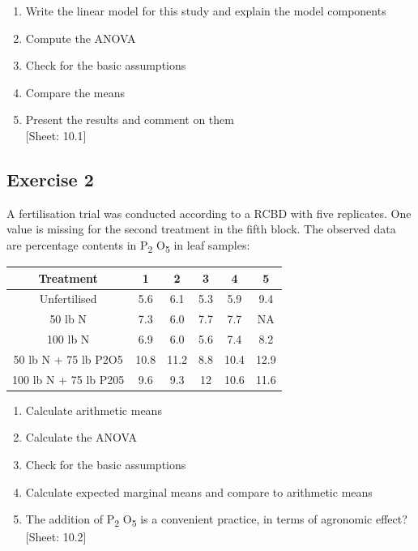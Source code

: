 \documentclass[a4paper,12pt,oneside]{book}
\providecommand{\tightlist}{%
  \setlength{\itemsep}{0pt}\setlength{\parskip}{0pt}}
\begin{document}
\begin{enumerate}
\def\labelenumi{\arabic{enumi}.}
\tightlist
\item
  Write the linear model for this study and explain the model components
\item
  Compute the ANOVA
\item
  Check for the basic assumptions
\item
  Compare the means
\item
  Present the results and comment on them\\
  {[}Sheet: 10.1{]}
\end{enumerate}

\hypertarget{exercise-2-6}{%
\subsection{Exercise 2}\label{exercise-2-6}}

A fertilisation trial was conducted according to a RCBD with five replicates. One value is missing for the second treatment in the fifth block. The observed data are percentage contents in P\textsubscript{2} O\textsubscript{5} in leaf samples:

\begin{longtable}[]{@{}cccccc@{}}
\toprule
Treatment & 1 & 2 & 3 & 4 & 5 \\
\midrule
\endhead
Unfertilised & 5.6 & 6.1 & 5.3 & 5.9 & 9.4 \\
50 lb N & 7.3 & 6.0 & 7.7 & 7.7 & NA \\
100 lb N & 6.9 & 6.0 & 5.6 & 7.4 & 8.2 \\
50 lb N + 75 lb P2O5 & 10.8 & 11.2 & 8.8 & 10.4 & 12.9 \\
100 lb N + 75 lb P205 & 9.6 & 9.3 & 12 & 10.6 & 11.6 \\
\bottomrule
\end{longtable}

\begin{enumerate}
\def\labelenumi{\arabic{enumi}.}
\tightlist
\item
  Calculate arithmetic means
\item
  Calculate the ANOVA
\item
  Check for the basic assumptions
\item
  Calculate expected marginal means and compare to arithmetic means
\item
  The addition of P\textsubscript{2} O\textsubscript{5} is a convenient practice, in terms of agronomic effect?\\
  {[}Sheet: 10.2{]}
\end{enumerate}
\end{document}
